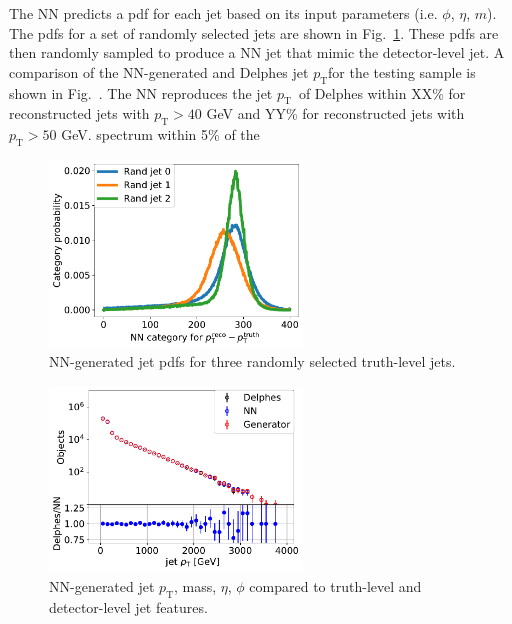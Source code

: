 \documentclass[showpacs,showkeys,preprint,prd,nofootinbib,linenumbers,12pt]{revtex4-1}
\def\pt{\ensuremath{p_{\mathrm{T}}}}
\begin{document}
The NN predicts a pdf for each jet based on its input parameters (i.e. $\phi$, $\eta$, $m$). The pdfs for a set of randomly selected jets are shown in Fig.~\ref{fig:randomJetPDF}. These pdfs are then randomly sampled to produce a NN jet that mimic the detector-level jet. A comparison of the NN-generated and Delphes jet \pt for the testing sample is shown in Fig.~\cite{fig:nnVsDelphes}. The NN reproduces the jet \pt\ of Delphes within XX\% for reconstructed jets with $\pt>40$ GeV and YY\% for reconstructed jets with $\pt>50$ GeV. spectrum within 5\% of the 


\begin{figure}[htb]
  \includegraphics[width=0.6\textwidth]{nnOutput_pT.pdf}
  \caption{NN-generated jet pdfs for three randomly selected truth-level jets. }
  \label{fig:randomJetPDF}
\end{figure}

\begin{figure}[htb]
  \includegraphics[width=0.6\textwidth]{jet_pT_genVsReco_origScale_test_log.pdf}
  \caption{NN-generated jet \pt, mass, $\eta$, $\phi$ compared to truth-level and detector-level jet features. }
  \label{fig:nnVsDelphes}
\end{figure}
\end{document}
